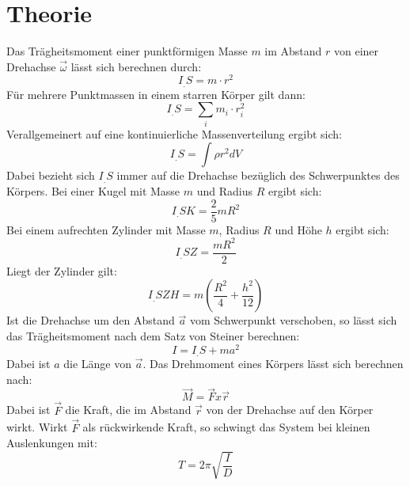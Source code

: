 
\section{Theorie}
\label{sec:Theorie}

Das Trägheitsmoment einer punktförmigen Masse $m$ im Abstand $r$ von einer Drehachse $\vec{\omega}$ lässt sich berechnen durch:
\begin{equation}
I_.S = m\cdot r^2 
\end{equation}
Für mehrere Punktmassen in einem starren Körper gilt dann:
\begin{equation}
I_.S = \sum_i m_i\cdot r_i^2
\end{equation}
Verallgemeinert auf eine kontinuierliche Massenverteilung ergibt sich:
\begin{equation}
I_.S = \int \rho r^2 dV \label{eq:I_S}
\end{equation}
Dabei bezieht sich $I_.S$ immer auf die Drehachse bezüglich des Schwerpunktes des Körpers.\newline  
Bei einer Kugel mit Masse $m$ und Radius $R$ ergibt sich:
\begin{equation}
I_.{SK} = \frac{2}{5}mR^2 \label{eq:I_SK}
\end{equation}
Bei einem aufrechten Zylinder mit Masse $m$, Radius $R$ und Höhe $h$ ergibt sich:
\begin{equation}
I_.{SZ} = \frac{mR^2}{2} \label{eq:I_SZ}
\end{equation}
Liegt der Zylinder gilt:
\begin{equation}
I_.{SZH} = m\left(\frac{R^2}{4}+\frac{h^2}{12}\right) \label{eq:I_SZH}
\end{equation}
Ist die Drehachse um den Abstand $\vec{a}$ vom Schwerpunkt verschoben, so lässt sich das Trägheitsmoment nach dem Satz von Steiner berechnen:
\begin{equation}
I = I_.S+m a^2 \label{eq:Satz von Steiner}
\end{equation}
Dabei ist $a$ die Länge von $\vec{a}$. Das Drehmoment eines Körpers lässt sich berechnen nach:
\begin{equation}
\vec{M} = \vec{F}x\vec{r} \label{eq;M}
\end{equation}
Dabei ist $\vec{F}$ die Kraft, die im Abstand $\vec{r}$ von der Drehachse auf den Körper wirkt. Wirkt $\vec{F}$ als rückwirkende Kraft, so schwingt das System bei kleinen Auslenkungen mit:
\begin{equation}
T = 2\pi\sqrt{\frac{I}{D}} \label{eq:T}
\end{equation}

